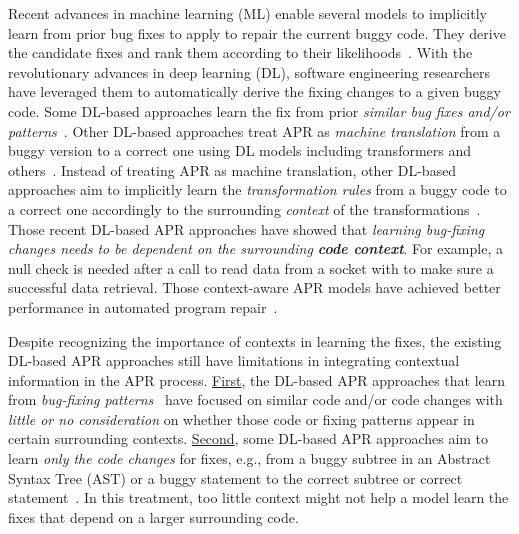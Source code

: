 Recent advances in machine learning (ML) enable several models to
implicitly learn from prior bug fixes to apply to repair the current
buggy code. They derive the candidate fixes and rank them according to
their
likelihoods~\cite{long2016automatic,long2017automatic,saha2017elixir}.
With the revolutionary advances in deep learning (DL), software
engineering researchers have leveraged them to automatically derive the
fixing changes to a given buggy code. Some DL-based approaches learn
the fix from prior {\em similar bug fixes and/or
  patterns}~\cite{gupta2017deepfix,white2019sorting,white2016deep}.
Other DL-based approaches treat APR as {\em machine translation} from
a buggy version to a correct one using DL models including
transformers and
others~\cite{chakrabortycodit,chen2018sequencer,hata2018learning,tufano2018empirical,see2017get}. Instead
of treating APR as machine translation, other DL-based approaches aim
to implicitly learn the {\em transformation rules} from a buggy code
to a correct one accordingly to the surrounding {\em context} of the
transformations~\cite{chen2018sequencer,icse20,cure-icse21,lutellier2020coconut}. Those
recent DL-based APR approaches have showed that {\em learning
  bug-fixing changes needs to be dependent on the surrounding {\bf
    code context}}. For example, a null check is needed after a call
to read data from a socket with  to make
sure a successful data retrieval. Those context-aware APR models have
achieved better performance in automated program
repair~\cite{icse20,lutellier2020coconut,cure-icse21}.

Despite recognizing the importance of contexts in learning the fixes,
the existing DL-based APR approaches still have limitations in
integrating contextual information in the APR
process. \underline{First}, the DL-based APR approaches that learn
from {\em bug-fixing patterns}~\cite{white2016deep,gupta2017deepfix}
have focused on similar code and/or code changes with {\em little or
  no consideration} on whether those code or fixing patterns appear in
certain surrounding contexts. \underline{Second}, some DL-based APR
approaches aim to learn {\em only the code changes} for fixes, e.g.,
from a buggy subtree in an Abstract Syntax Tree (AST) or a buggy
statement to the correct subtree or correct
statement~\cite{chakrabortycodit,see2017get}. In this treatment, too
little context might not help a model learn the fixes that depend on a
larger surrounding code.

